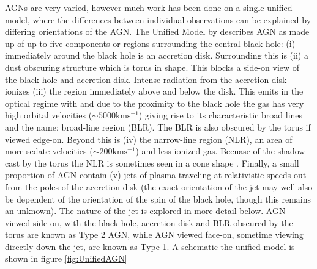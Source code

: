 AGNs are very varied, however much work has been done on a single unified model, where the differences between individual observations can be explained by differing orientations of the AGN. The Unified Model by \citet{Antonucci1993} describes AGN as made up of up to five components or regions surrounding the central black hole: (i) immediately around the black hole is an accretion disk. Surrounding this is (ii) a dust obscuring structure which is torus in shape. This blocks a side-on view of the black hole and accretion disk. Intense radiation from the accretion disk ionizes (iii) the region immediately above and below the disk. This emits in the optical regime with and due to the proximity to the black hole the gas has very high orbital velocities ($\sim 5000 \mathrm{km s^{-1}}$) giving rise to its characteristic broad lines and the name: broad-line region (BLR). The BLR is also obscured by the torus if viewed edge-on. Beyond this is (iv) the narrow-line region (NLR), an area of more sedate velocities ($\sim 200 \mathrm{km s^{-1}}$) and less ionized gas. Becuase of the shadow cast by the torus the NLR is sometimes seen in a cone shape \citep{Wilson1994}. Finally, a small proportion of AGN contain (v) jets of plasma traveling at relativistic speeds out from the poles of the accretion disk (the exact orientation of the jet may well also be dependent of the orientation of the spin of the black hole, though this remains an unknown). The nature of the jet is explored in more detail below. AGN viewed side-on, with the black hole, accretion disk and BLR obscured by the torus are known as Type 2 AGN, while AGN viewed face-on, sometime viewing directly down the jet, are known as Type 1. A schematic the unified model is shown in figure \ref{fig:UnifiedAGN}

